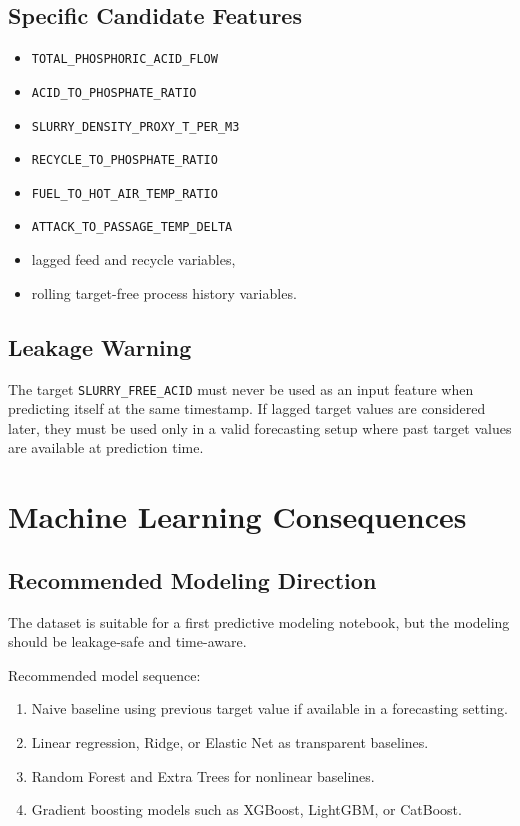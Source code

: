 \documentclass[11pt,a4paper]{article}
\begin{document}
\subsection{Specific Candidate Features}

\begin{itemize}
    \item \texttt{TOTAL\_PHOSPHORIC\_ACID\_FLOW}
    \item \texttt{ACID\_TO\_PHOSPHATE\_RATIO}
    \item \texttt{SLURRY\_DENSITY\_PROXY\_T\_PER\_M3}
    \item \texttt{RECYCLE\_TO\_PHOSPHATE\_RATIO}
    \item \texttt{FUEL\_TO\_HOT\_AIR\_TEMP\_RATIO}
    \item \texttt{ATTACK\_TO\_PASSAGE\_TEMP\_DELTA}
    \item lagged feed and recycle variables,
    \item rolling target-free process history variables.
\end{itemize}

\subsection{Leakage Warning}

The target \texttt{SLURRY\_FREE\_ACID} must never be used as an input feature when predicting itself at the same timestamp. If lagged target values are considered later, they must be used only in a valid forecasting setup where past target values are available at prediction time.

\section{Machine Learning Consequences}

\subsection{Recommended Modeling Direction}

The dataset is suitable for a first predictive modeling notebook, but the modeling should be leakage-safe and time-aware.

Recommended model sequence:

\begin{enumerate}
    \item Naive baseline using previous target value if available in a forecasting setting.
    \item Linear regression, Ridge, or Elastic Net as transparent baselines.
    \item Random Forest and Extra Trees for nonlinear baselines.
    \item Gradient boosting models such as XGBoost, LightGBM, or CatBoost.
\end{enumerate}
\end{document}
